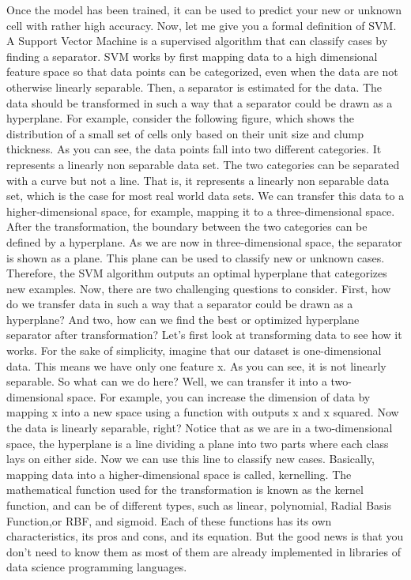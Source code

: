 	Once the model has been trained, it can be used to predict your new or unknown cell with rather high accuracy. Now, let me give you a formal definition of SVM. A Support Vector Machine is a supervised algorithm that can classify cases by finding a separator. SVM works by first mapping data to a high dimensional feature space so that data points can be categorized, even when the data are not otherwise linearly separable. Then, a separator is estimated for the data. The data should be transformed in such a way that a separator could be drawn as a hyperplane. For example, consider the following figure, which shows the distribution of a small set of cells only based on their unit size and clump thickness. As you can see, the data points fall into two different categories. It represents a linearly non separable data set. The two categories can be separated with a curve but not a line. That is, it represents a linearly non separable data set, which is the case for most real world data sets. We can transfer this data to a higher-dimensional space, for example, mapping it to a three-dimensional space. After the transformation, the boundary between the two categories can be defined by a hyperplane. As we are now in three-dimensional space, the separator is shown as a plane. This plane can be used to classify new or unknown cases. Therefore, the SVM algorithm outputs an optimal hyperplane that categorizes new examples. Now, there are two challenging questions to consider. First, how do we transfer data in such a way that a separator could be drawn as a hyperplane? And two, how can we find the best or optimized hyperplane separator after transformation? Let's first look at transforming data to see how it works. For the sake of simplicity, imagine that our dataset is one-dimensional data. This means we have only one feature x. As you can see, it is not linearly separable. So what can we do here? Well, we can transfer it into a two-dimensional space. For example, you can increase the dimension of data by mapping x into a new space using a function with outputs x and x squared. Now the data is linearly separable, right? Notice that as we are in a two-dimensional space, the hyperplane is a line dividing a plane into two parts where each class lays on either side. Now we can use this line to classify new cases. Basically, mapping data into a higher-dimensional space is called, kernelling. The mathematical function used for the transformation is known as the kernel function, and can be of different types, such as linear, polynomial, Radial Basis Function,or RBF, and sigmoid. Each of these functions has its own characteristics, its pros and cons, and its equation. But the good news is that you don't need to know them as most of them are already implemented in libraries of data science programming languages.
